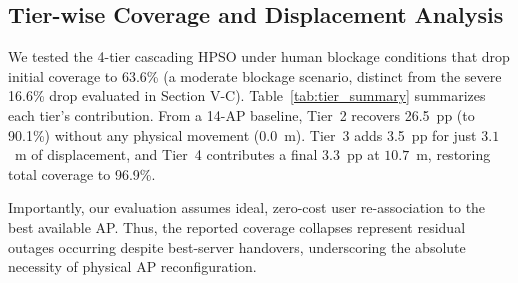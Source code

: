 \documentclass[conference]{IEEEtran}
\begin{document}
	\subsection{Tier-wise Coverage and Displacement Analysis}
	
	We tested the 4-tier cascading HPSO under human blockage conditions that drop initial coverage to 63.6\% (a moderate blockage scenario, distinct from the severe 16.6\% drop evaluated in Section V-C). Table~\ref{tab:tier_summary} summarizes each tier's contribution. From a 14-AP baseline, Tier~2 recovers 26.5~pp (to 90.1\%) without any physical movement ($0.0$~m). Tier~3 adds 3.5~pp for just $3.1$~m of displacement, and Tier~4 contributes a final 3.3~pp at $10.7$~m, restoring total coverage to 96.9\%.

	Importantly, our evaluation assumes ideal, zero-cost user re-association to the best available AP. Thus, the reported coverage collapses represent residual outages occurring despite best-server handovers, underscoring the absolute necessity of physical AP reconfiguration.
	
	\begin{table}[htbp]
		\centering
		\caption{Tier-wise Coverage and Displacement Summary}
		\label{tab:tier_summary}
		\vspace{-10pt}
	\end{table}
	
\end{document}
